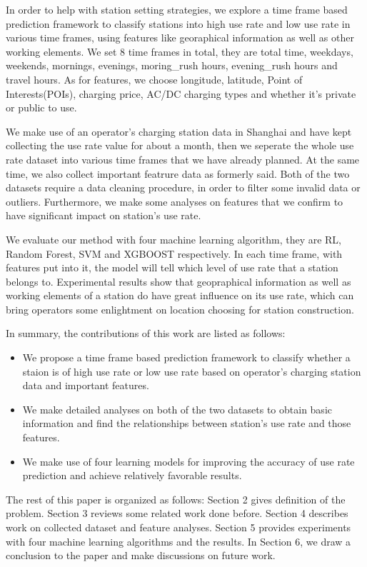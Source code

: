 In order to help with station setting strategies, we explore a time frame based prediction framework to classify stations into high use rate and low use rate in various time frames, using features like georaphical information as well as other working elements. We set 8 time frames in total, they are total time, weekdays, weekends, mornings, evenings, moring\_rush hours, evening\_rush hours and travel hours. As for features, we choose longitude, latitude, Point of Interests(POIs), charging price, AC/DC charging types and whether it's private or public to use.

We make use of an operator's charging station data in Shanghai and  have kept collecting the use rate value for about a month, then we seperate the whole use rate dataset into various time frames that we have already planned. At the same time, we also collect important featrure data as formerly said. Both of the two datasets require a data cleaning procedure, in order to filter some invalid data or outliers. Furthermore, we make some analyses on features that we confirm to have significant impact on station's use rate.

We evaluate our method with four machine learning algorithm, they are RL, Random Forest, SVM and XGBOOST respectively. In each time frame, with features put into it, the model will tell which level of use rate that a station belongs to. Experimental results show that geopraphical information as well as working elements of a station do have great influence on its use rate, which can bring operators some enlightment on location choosing for station construction.

In summary, the contributions of this work are listed as follows:
\begin{itemize}
	\item We propose a time frame based prediction framework to classify whether a staion is of high use rate or low use rate based on operator's charging station data and important features.
	\item We make detailed analyses on both of the two datasets to obtain basic information and find the relationships between station's use rate and those features.
	\item We make use of four learning models for improving the accuracy of use rate prediction and achieve relatively favorable results.
\end{itemize}

The rest of this paper is organized as follows: Section 2 gives definition of the problem. Section 3 reviews some related work done before. Section 4 describes work on collected dataset and feature analyses. Section 5 provides experiments with four machine learning algorithms and the results. In Section 6, we draw a conclusion to the paper and make discussions on future work.
